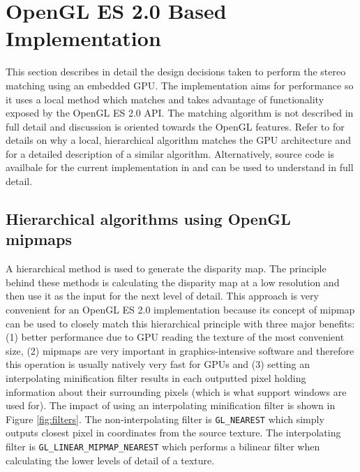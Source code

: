 \documentclass[conference]{IEEEtran}
\begin{document}

\section{OpenGL ES 2.0 Based Implementation}
This section describes in detail the design decisions taken to perform the stereo matching using an embedded GPU. The implementation aims for performance so it uses a local method which matches and takes advantage of functionality exposed by the OpenGL ES 2.0 API. The matching algorithm is not described in full detail and discussion is oriented towards the OpenGL features. Refer to \cite{jonsson03} for details on why a local, hierarchical algorithm matches the GPU architecture and for a detailed description of a similar algorithm. Alternatively, source code is availbale for the current implementation in \cite{aguiar14} and can be used to understand in full detail.

	\subsection{Hierarchical algorithms using OpenGL mipmaps}
A hierarchical method is used to generate the disparity map. The principle behind these methods is calculating the disparity map at a low resolution and then use it as the input for the next level of detail. This approach is very convenient for an OpenGL ES 2.0 implementation because its concept of mipmap can be used to closely match this hierarchical principle with three major benefits: (1) better performance due to GPU reading the texture of the most convenient size, (2) mipmaps are very important in graphics-intensive software and therefore this operation is usually natively very fast for GPUs and (3) setting an interpolating minification filter results in each outputted pixel holding information about their surrounding pixels (which is what support windows are used for). The impact of using an interpolating minification filter is shown in Figure \ref{fig:filters}. The non-interpolating filter is \texttt{GL\_NEAREST} which simply outputs closest pixel in coordinates from the source texture. The interpolating filter is \texttt{GL\_LINEAR\_MIPMAP\_NEAREST} which performs a bilinear filter when calculating the lower levels of detail of a texture.
\end{document}
